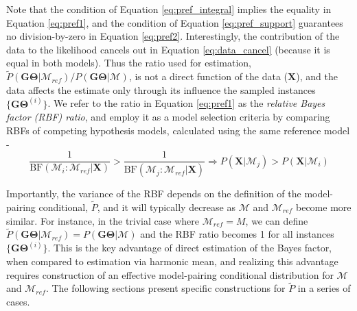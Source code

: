 \documentclass[11pt]{article}
\newcommand{\vect}[1]{\boldsymbol{\mathbf{#1}}}
\newcommand{\X}{\vect{X}}
\newcommand{\M}{\mathcal{M}}
\newcommand{\G}{\vect{G}}
\newcommand{\T}{\vect{\Theta}}
\newcommand{\GT}{\G\T}
\newcommand{\Mref}{\M_{ref}}
\newcommand{\Pref}{\widetilde{P}}
\newcommand{\rbf}{\text{BF}}
\newcommand{\1}{\mathbbm{1}}
\begin{document}
Note that the condition of Equation \ref{eq:pref_integral} implies the equality in Equation \ref{eq:pref1},
and the condition of Equation \ref{eq:pref_support} guarantees no division-by-zero in Equation \ref{eq:pref2}.
%
Interestingly, the contribution of the data to the likelihood cancels out in Equation \ref{eq:data_cancel} (because it is equal in both models).
%
Thus the ratio used for estimation, ${\Pref(\GT|\Mref) }/{P(\GT|\M)}$, is not a direct function of the data ($\X$),
and the data affects the estimate only through its influence the sampled instances $\{\GT^{(i)}\}$.
%
We refer to the ratio in Equation \ref{eq:pref1} as the {\em relative Bayes factor (RBF) ratio}, and employ it as a model selection criteria by comparing RBFs of competing hypothesis models, calculated using the same reference model - 
\[ \frac{1}{\rbf(\M_i:\Mref|\X)} >  \frac{1}{\rbf(\M_j:\Mref|\X)} \Rightarrow P(\X|\M_j) >  P(\X|\M_i)\]


Importantly, the variance of the RBF depends on the definition of the model-pairing conditional, $\Pref$, and it will typically decrease as $\M$ and $\Mref$ become more similar.
%
For instance, in the trivial case where $\Mref=M$, we can define $\Pref(\GT|\Mref)=P(\GT|\M)$ and the RBF ratio becomes 1 for all instances $\{\GT^{(i)}\}$.
%
This is the key advantage of direct estimation of the Bayes factor, when compared to estimation via harmonic mean, and realizing this advantage requires construction of an effective model-pairing conditional distribution for $\M$ and $\Mref$.
%
The following sections present specific constructions for $\Pref$ in a series of cases.
\end{document}
